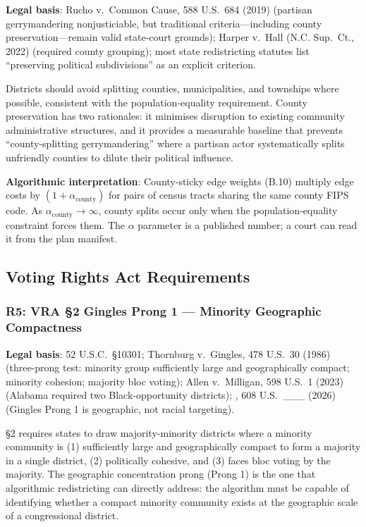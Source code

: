 \textbf{Legal basis}: Rucho v.\ Common Cause, 588 U.S.\ 684 (2019) (partisan
gerrymandering nonjusticiable, but traditional criteria---including county
preservation---remain valid state-court grounds); Harper v.\ Hall (N.C. Sup.\ Ct.,
2022) (required county grouping); most state redistricting statutes list
``preserving political subdivisions'' as an explicit criterion.

Districts should avoid splitting counties, municipalities, and townships where
possible, consistent with the population-equality requirement.
County preservation has two rationales: it minimises disruption to existing
community administrative structures, and it provides a measurable baseline that
prevents ``county-splitting gerrymandering'' where a partisan actor systematically
splits unfriendly counties to dilute their political influence.

\textbf{Algorithmic interpretation}: County-sticky edge weights (B.10) multiply
edge costs by $(1 + \alpha_\text{county})$ for pairs of census tracts sharing the
same county FIPS code.
As $\alpha_\text{county} \to \infty$, county splits occur only when the
population-equality constraint forces them.
The $\alpha$ parameter is a published number; a court can read it from the
plan manifest.

\subsection{Voting Rights Act Requirements}

\subsubsection*{R5: VRA \S2 Gingles Prong 1 --- Minority Geographic Compactness}

\textbf{Legal basis}: 52 U.S.C.\ \S10301; Thornburg v.\ Gingles, 478 U.S.\ 30
(1986) (three-prong test: minority group sufficiently large and geographically
compact; minority cohesion; majority bloc voting); Allen v.\ Milligan,
598 U.S.\ 1 (2023) (Alabama required two Black-opportunity districts);
\callais{}, 608 U.S.\ \_\_\_ (2026) (Gingles Prong 1 is geographic, not racial
targeting).

\S2 requires states to draw majority-minority districts where a minority
community is (1) sufficiently large and geographically compact to form a majority
in a single district, (2) politically cohesive, and (3) faces bloc voting by
the majority.
The geographic concentration prong (Prong 1) is the one that algorithmic
redistricting can directly address: the algorithm must be capable of identifying
whether a compact minority community exists at the geographic scale of a
congressional district.

